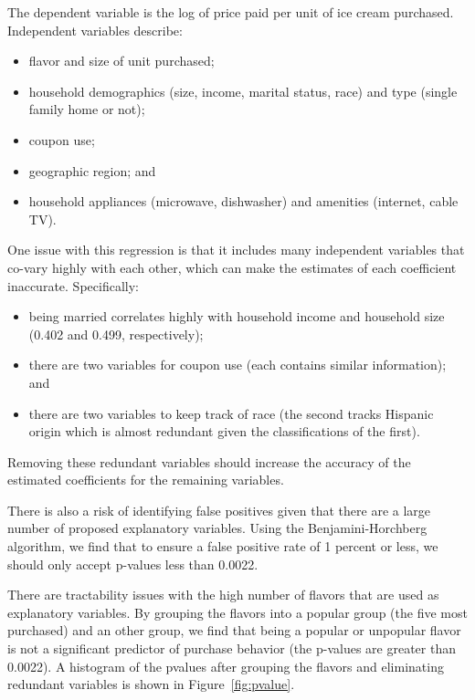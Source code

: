 \documentclass[11pt, fleqn]{article}
\begin{document}
The dependent variable is the log of price paid per unit of ice cream purchased. Independent variables describe:
\begin{itemize}
  \item flavor and size of unit purchased;
  \item household demographics (size, income, marital status, race) and type (single family home or not);
  \item coupon use;
  \item geographic region; and
  \item household appliances (microwave, dishwasher) and amenities (internet, cable TV).
\end{itemize}

One issue with this regression is that it includes many independent variables that co-vary highly with each other, which can make the estimates of each coefficient inaccurate. Specifically:
\begin{itemize}
  \item being married correlates highly with household income and household size (0.402 and 0.499, respectively);
  \item there are two variables for coupon use (each contains similar information); and
  \item there are two variables to keep track of race (the second tracks Hispanic origin which is almost redundant given the classifications of the first).
\end{itemize}
Removing these redundant variables should increase the accuracy of the estimated coefficients for the remaining variables. 

There is also a risk of identifying false positives given that there are a large number of proposed explanatory variables. Using the Benjamini-Horchberg algorithm, we find that to ensure a false positive rate of 1 percent or less, we should only accept p-values less than 0.0022.

There are tractability issues with the high number of flavors that are used as explanatory variables. By grouping the flavors into a popular group (the five most purchased) and an other group, we find that being a popular or unpopular flavor is not a significant predictor of purchase behavior (the p-values are greater than 0.0022).  A histogram of the pvalues after grouping the flavors and eliminating redundant variables is shown in Figure~\vref{fig:pvalue}.
\end{document}
